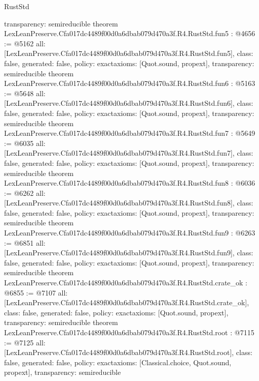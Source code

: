 \begin{lexlean}{RustStd}
\begin{coremodule}
{  transparency: semireducible
}
theorem LexLeanPreserve.Cfa017dc4489f00d0a6dbab079d470a3f.R4.RustStd.fun5 : @4656 := @5162 {
  all: [LexLeanPreserve.Cfa017dc4489f00d0a6dbab079d470a3f.R4.RustStd.fun5],
  class: false,
  generated: false,
  policy: exact{axioms: [Quot.sound, propext]},
  transparency: semireducible
}
theorem LexLeanPreserve.Cfa017dc4489f00d0a6dbab079d470a3f.R4.RustStd.fun6 : @5163 := @5648 {
  all: [LexLeanPreserve.Cfa017dc4489f00d0a6dbab079d470a3f.R4.RustStd.fun6],
  class: false,
  generated: false,
  policy: exact{axioms: [Quot.sound, propext]},
  transparency: semireducible
}
theorem LexLeanPreserve.Cfa017dc4489f00d0a6dbab079d470a3f.R4.RustStd.fun7 : @5649 := @6035 {
  all: [LexLeanPreserve.Cfa017dc4489f00d0a6dbab079d470a3f.R4.RustStd.fun7],
  class: false,
  generated: false,
  policy: exact{axioms: [Quot.sound, propext]},
  transparency: semireducible
}
theorem LexLeanPreserve.Cfa017dc4489f00d0a6dbab079d470a3f.R4.RustStd.fun8 : @6036 := @6262 {
  all: [LexLeanPreserve.Cfa017dc4489f00d0a6dbab079d470a3f.R4.RustStd.fun8],
  class: false,
  generated: false,
  policy: exact{axioms: [Quot.sound, propext]},
  transparency: semireducible
}
theorem LexLeanPreserve.Cfa017dc4489f00d0a6dbab079d470a3f.R4.RustStd.fun9 : @6263 := @6851 {
  all: [LexLeanPreserve.Cfa017dc4489f00d0a6dbab079d470a3f.R4.RustStd.fun9],
  class: false,
  generated: false,
  policy: exact{axioms: [Quot.sound, propext]},
  transparency: semireducible
}
theorem LexLeanPreserve.Cfa017dc4489f00d0a6dbab079d470a3f.R4.RustStd.crate_ok : @6855 := @7107 {
  all: [LexLeanPreserve.Cfa017dc4489f00d0a6dbab079d470a3f.R4.RustStd.crate_ok],
  class: false,
  generated: false,
  policy: exact{axioms: [Quot.sound, propext]},
  transparency: semireducible
}
theorem LexLeanPreserve.Cfa017dc4489f00d0a6dbab079d470a3f.R4.RustStd.root : @7115 := @7125 {
  all: [LexLeanPreserve.Cfa017dc4489f00d0a6dbab079d470a3f.R4.RustStd.root],
  class: false,
  generated: false,
  policy: exact{axioms: [Classical.choice, Quot.sound, propext]},
  transparency: semireducible
}


\end{coremodule}
\end{lexlean}
